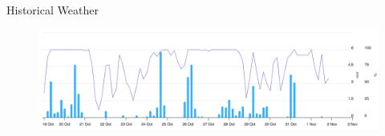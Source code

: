 \begin{frame}{Historical Weather}
    \begin{figure}
        \centering
        \includegraphics[width=\textwidth]{sections/2_preprocessing/imgs/openmeteolegenda.png}
    \end{figure}
\end{frame}